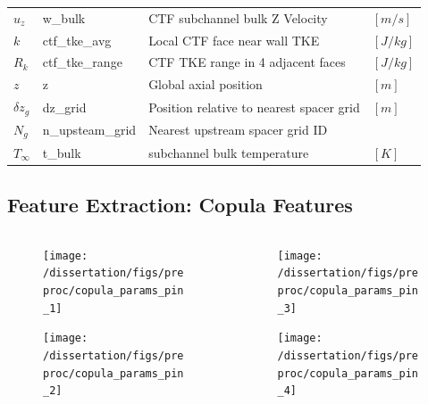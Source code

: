 \documentclass[t, pdftex]{beamer}
\begin{document}
\begin{frame}
\begin{table}[h]
\begin{center}
\begin{tabular}[h]{|l | l | l | l |}
            $u_z$ & w\_bulk & CTF subchannel bulk Z Velocity &  $[m/s]$ \\
            $k$ & ctf\_tke\_avg & Local CTF face near wall TKE &  $[J/kg]$ \\
            $R_k$ & ctf\_tke\_range & CTF TKE range in 4 adjacent faces & $[J/kg]$ \\
            $z$ & z & Global axial position & $[m]$ \\
            $\delta z_g$ & dz\_grid & Position relative to nearest spacer grid & $[m]$ \\
            $N_g$ & n\_upsteam\_grid  & Nearest upstream spacer grid ID &  \\
            $T_\infty$ & t\_bulk & subchannel bulk temperature  &  $[K]$ \\
            \hline
        \end{tabular}
        \label{tab:features}
    \end{center}
\end{table}
\end{frame}

\subsection*{Feature Extraction: Copula Features}
\begin{frame}
\vspace{-34pt}
\begin{columns}
    \begin{column}{0.5\textwidth}
        \begin{figure}[H]%
            \texttt{[image: /dissertation/figs/preproc/copula\_params\_pin\_1]}
        \end{figure}
    \vspace{-26pt}
            \begin{figure}[H]%
                \texttt{[image: /dissertation/figs/preproc/copula\_params\_pin\_2]}
            \end{figure}
    \end{column}
    \begin{column}{0.5\textwidth}
        \begin{figure}[H]%
            \texttt{[image: /dissertation/figs/preproc/copula\_params\_pin\_3]}
        \end{figure}
    \vspace{-26pt}
            \begin{figure}[H]%
                \texttt{[image: /dissertation/figs/preproc/copula\_params\_pin\_4]}
            \end{figure}
\end{column}
\end{columns}
\end{frame}
\end{document}
